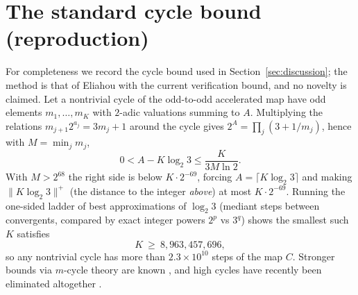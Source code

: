\documentclass[11pt]{article}
\theoremstyle{definition}
\newcommand{\ceil}[1]{\lceil #1\rceil}
\begin{document}
\appendix

\section{The standard cycle bound (reproduction)}\label{app:cycle}

For completeness we record the cycle bound used in
Section~\ref{sec:discussion}; the method is that of Eliahou
\cite{Eliahou1993} with the current verification bound, and no novelty is
claimed. Let a nontrivial cycle of the odd-to-odd accelerated map have odd
elements $m_1,\dots,m_K$ with $2$-adic valuations summing to $A$.
Multiplying the relations $m_{j+1}2^{a_j}=3m_j+1$ around the cycle gives
$2^A=\prod_j(3+1/m_j)$, hence with $M=\min_j m_j$,
\[
0<A-K\log_2 3\le \frac{K}{3M\ln 2}.
\]
With $M>2^{68}$ \cite{Barina2021} the right side is below
$K\cdot 2^{-69}$, forcing $A=\ceil{K\log_2 3}$ and making
$\|K\log_2 3\|^{+}$ (the distance to the integer \emph{above}) at most
$K\cdot 2^{-69}$. Running the one-sided ladder of best approximations of
$\log_2 3$ (mediant steps between convergents, compared by exact integer
powers $2^p$ vs $3^q$) shows the smallest such $K$ satisfies
\[
K\ \ge\ 8{,}963{,}457{,}696,
\]
so any nontrivial cycle has more than $2.3\times 10^{10}$ steps of the map
$C$. Stronger bounds via $m$-cycle theory are known
\cite{SimonsDeWeger2005}, and high cycles have recently been eliminated
altogether \cite{Knight2026}.
\end{document}
